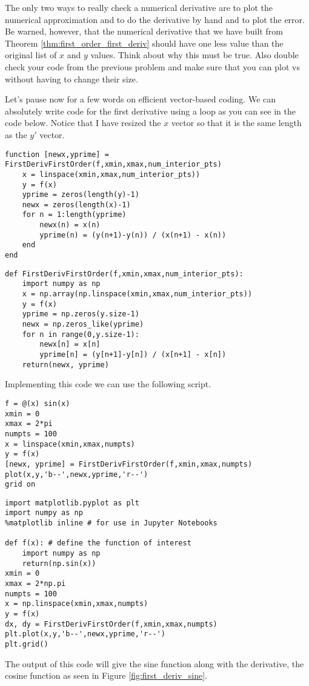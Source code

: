 The only two ways to really check a numerical derivative are to plot the numerical
approximation and to do the derivative by hand and to plot the error. Be warned, however,
that the numerical derivative that we have built from Theorem
\ref{thm:first_order_first_deriv} should have one less value than the
original list of $x$ and $y$ values.  Think about why this must be true. Also double check
your code from the previous problem and make sure that you can plot  vs
 without having to change their size.  

\begin{example}
Let's pause now for a few words on efficient vector-based coding.  We can absolutely write
code for the first derivative using a  loop as you can see in the code below.
Notice that I have resized the $x$ vector so that it is the same length as the $y'$ vector.

\bcode
\ifnum{}
\begin{lstlisting}
function [newx,yprime] = FirstDerivFirstOrder(f,xmin,xmax,num_interior_pts)
    x = linspace(xmin,xmax,num_interior_pts))
    y = f(x)
    yprime = zeros(length(y)-1)
    newx = zeros(length(x)-1)
    for n = 1:length(yprime)
        newx(n) = x(n)
        yprime(n) = (y(n+1)-y(n)) / (x(n+1) - x(n))
    end
end
\end{lstlisting}
\else
\begin{lstlisting}
def FirstDerivFirstOrder(f,xmin,xmax,num_interior_pts):
    import numpy as np
    x = np.array(np.linspace(xmin,xmax,num_interior_pts))
    y = f(x)
    yprime = np.zeros(y.size-1)
    newx = np.zeros_like(yprime)
    for n in range(0,y.size-1):
        newx[n] = x[n]
        yprime[n] = (y[n+1]-y[n]) / (x[n+1] - x[n])
    return(newx, yprime)
\end{lstlisting}
\fi

Implementing this code we can use the following script.

\bcode
\ifnum{}
\begin{lstlisting}
f = @(x) sin(x)
xmin = 0
xmax = 2*pi
numpts = 100
x = linspace(xmin,xmax,numpts)
y = f(x)
[newx, yprime] = FirstDerivFirstOrder(f,xmin,xmax,numpts)
plot(x,y,'b--',newx,yprime,'r--')
grid on
\end{lstlisting}
\else
\begin{lstlisting}
import matplotlib.pyplot as plt
import numpy as np
%matplotlib inline # for use in Jupyter Notebooks

def f(x): # define the function of interest
    import numpy as np
    return(np.sin(x))
xmin = 0
xmax = 2*np.pi
numpts = 100
x = np.linspace(xmin,xmax,numpts)
y = f(x)
dx, dy = FirstDerivFirstOrder(f,xmin,xmax,numpts)
plt.plot(x,y,'b--',newx,yprime,'r--')
plt.grid()
\end{lstlisting}
\fi
The output of this code will give the sine function along with the derivative, the cosine
function as seen in Figure \ref{fig:first_deriv_sine}.


\end{example}
